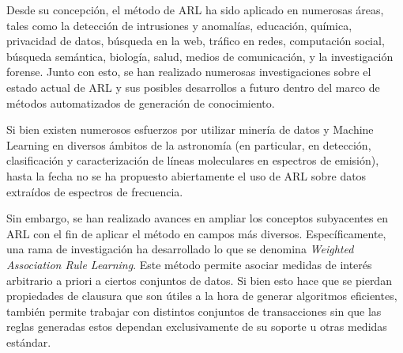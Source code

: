 Desde su concepción, el método de ARL ha sido aplicado en numerosas áreas, tales como la detección de intrusiones\cite{lee2000framework} y anomalías\cite{patcha2007overview}\cite{chandola2009anomaly}, educación\cite{romero2007educational}\cite{romero2008data}, química\cite{dehaspe1998finding}, privacidad de datos\cite{ghinita2008private}, búsqueda en la web\cite{ferragina2008personalized}, tráfico en redes\cite{estan2003automatically}, computación social\cite{li2008tag}, búsqueda semántica\cite{cohen2007associative}, biología\cite{kramer2001molecular}\cite{carmona2007genecodis}, salud\cite{karabatak2009expert}\cite{chaves2011efficient}, medios de comunicación\cite{davidson2010youtube}\cite{kobilarov2009media}, y la investigación forense\cite{iqbal2013unified}. Junto con esto, se han realizado numerosas investigaciones sobre el estado actual de ARL y sus posibles desarrollos a futuro dentro del marco de métodos automatizados de generación de conocimiento\cite{han2007frequent}.

Si bien existen numerosos esfuerzos por utilizar minería de datos y Machine Learning en diversos ámbitos de la astronomía (en particular, en detección, clasificación y caracterización de líneas moleculares en espectros de emisión\cite{vskoda2011searching}), hasta la fecha no se ha propuesto abiertamente el uso de ARL sobre datos extraídos de espectros de frecuencia. 

Sin embargo, se han realizado avances en ampliar los conceptos subyacentes en ARL con el fin de aplicar el método en campos más diversos\cite{brin1997beyond}. Específicamente, una rama de investigación ha desarrollado lo que se denomina \textit{Weighted Association Rule Learning}\cite{wang2000efficient}\cite{cai1998mining}. Este método permite asociar medidas de interés arbitrario a priori a ciertos conjuntos de datos. Si bien esto hace que se pierdan propiedades de clausura que son útiles a la hora de generar algoritmos eficientes, también permite trabajar con distintos conjuntos de transacciones sin que las reglas generadas estos dependan exclusivamente de su soporte u otras medidas estándar.


